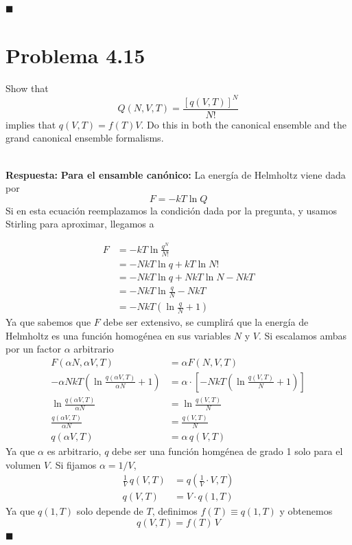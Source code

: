 \documentclass[]{article}
\numberwithin{equation}{section}
\newcommand{\0}{\textcolor{gray}{0}}
\newcommand{\qed}{\hfill\(\blacksquare\)}
\newcommand{\resp}{
	\\
	
	\textbf{Respuesta:} }
\begin{document}
\qed

\section{Problema 4.15}
Show that
\begin{equation}
	Q(N,V,T) = \frac{\left[q(V,T)\right]^N}{N!}
\end{equation}
implies that $q(V,T) = f(T)V$. Do this in both the canonical ensemble and the grand canonical ensemble formalisms.
\resp \textbf{Para el ensamble canónico:} La energía de Helmholtz viene dada por
\begin{equation*}
	F = -kT\ln Q
\end{equation*}
Si en esta ecuación reemplazamos la condición dada por la pregunta, y usamos Stirling para aproximar, llegamos a

\begin{align*}
	F &= -kT\ln\frac{q^N}{N!}\\
	&= -NkT\ln q + kT\ln N!\\
	&= -NkT\ln q + NkT\ln N - NkT\\
	&= -NkT\ln\frac{q}{N} - NkT\\
	&= -NkT\left(\ln\frac{q}{N} + 1\right)
\end{align*}
Ya que sabemos que $F$ debe ser extensivo, se cumplirá que la energía de Helmholtz es una función homogénea en sus  variables $N$ y $V$. Si escalamos ambas por un factor $\alpha$ arbitrario
\begin{align*}
	F(\alpha N, \alpha V, T) &= \alpha F(N, V, T)\\
	-\alpha N kT\left(\ln\frac{q(\alpha V, T)}{\alpha N} + 1\right) &= \alpha\cdot\left[-NkT\left(\ln\frac{q(V,T)}{N}+1\right)\right]\\
	\ln\frac{q(\alpha V, T)}{\alpha N} &= \ln\frac{q(V,T)}{N}\\
	\frac{q(\alpha V, T)}{\alpha N} &= \frac{q(V,T)}{N}\\
	q(\alpha V, T) &= \alpha\, q(V, T)
\end{align*}
Ya que $\alpha$ es arbitrario, $q$ debe ser una función homgénea de grado 1 solo para el volumen $V$. Si fijamos $\alpha = 1/V$,
\begin{align*}
	\frac{1}{V}\,q(V,T) &= q\!\left(\frac{1}{V}\cdot V, T\right) \\
	q(V,T) &= V\cdot q(1,T)
\end{align*}
Ya que $q(1,T)$ solo depende de $T$, definimos $f(T) \equiv q(1,T)$ y obtenemos
\begin{equation}
	q(V,T) = f(T)\,V
\end{equation}
\qed
\end{document}
